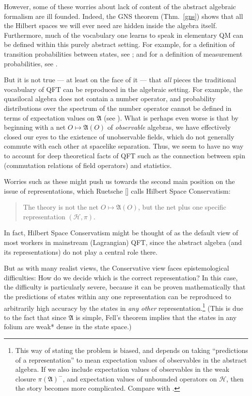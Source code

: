 \documentclass[11pt]{article}
\theoremstyle{definition}
\theoremstyle{definition}
\theoremstyle{remark}
\def\2#1{{\mathcal #1}}
\def\al#1{{\mathfrak #1}}
\begin{document}
However, some of these worries about lack of content of the abstract
algebraic formalism are ill founded.  Indeed, the GNS theorem (Thm.\
\ref{gns}) shows that all the Hilbert spaces we will ever need are
hidden inside the algebra itself.  Furthermore, much of the vocabulary
one learns to speak in elementary QM can be defined within this purely
abstract setting.  For example, for a definition of transition
probabilities between states, see \cite{robrop}; and for a definition
of measurement probabilities, see \cite{wald}.

But it is not true --- at least on the face of it --- that \emph{all}
pieces the traditional vocabulary of QFT can be reproduced in the
algebraic setting.  For example, the quasilocal algebra does not
contain a number operator, and probability distributions over the
spectrum of the number operator cannot be defined in terms of
expectation values on $\al A$ (see \cite{rindler}).  What is perhaps
even worse is that by beginning with a net $O\mapsto \al A(O)$ of
\emph{observable} algebras, we have effectively closed our eyes to the
existence of unobservable fields, which do not generally commute with
each other at spacelike separation.  Thus, we seem to have no way to
account for deep theoretical facts of QFT such as the connection
between spin (commutation relations of field operators) and
statistics.

Worries such as these might push us towards the second main position
on the issue of representations, which Ruetsche [\citeyear{ruetsche}]
calls Hilbert Space Conservatism:
\begin{quote}
  The theory is not the net $O\mapsto \al A (O)$, but the net plus one
  specific representation $(\2H ,\pi )$.
\end{quote}
In fact, Hilbert Space Conservatism might be thought of as the default
view of most workers in mainstream (Lagrangian) QFT, since the
abstract algebra (and its representations) do not play a central role
there.

But as with many realist views, the Conservative view faces
epistemological difficulties: How do we decide which is the correct
representation?  In this case, the difficulty is particularly severe,
because it can be proven mathematically that the predictions of states
within any one representation can be reproduced to arbitrarily high
accuracy by the states in \emph{any other}
representation.\footnote{This way of stating the problem is biased,
  and depends on taking ``predictions of a representation'' to mean
  expectation values of observables in the abstract algebra.  If we
  also include expectation values of observables in the weak closure
  $\pi (\al A)^{-}$, and expectation values of unbounded operators on
  $\2H$, then the story becomes more complicated.  Compare with
  \cite{clif}.}  (This is due to the fact that since $\al A$ is
simple, Fell's theorem implies that the states in any folium are weak*
dense in the state space.)
\end{document}
